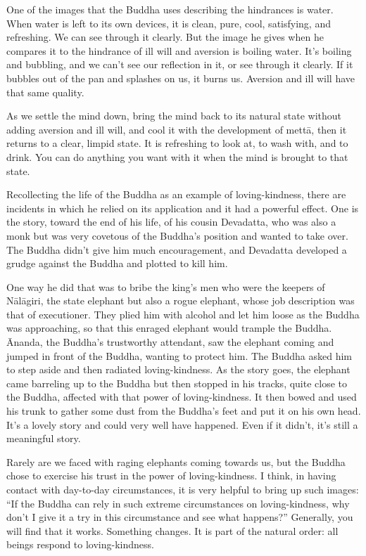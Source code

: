 One of the images that the Buddha uses describing the hindrances is
water. When water is left to its own devices, it is clean, pure, cool,
satisfying, and refreshing. We can see through it clearly. But the image
he gives when he compares it to the hindrance of ill will and aversion
is boiling water. It’s boiling and bubbling, and we can’t see our
reflection in it, or see through it clearly. If it bubbles out of the
pan and splashes on us, it burns us. Aversion and ill will have that
same quality.

As we settle the mind down, bring the mind back to its natural state
without adding aversion and ill will, and cool it with the development
of mettā, then it returns to a clear, limpid state. It is refreshing to
look at, to wash with, and to drink. You can do anything you want with
it when the mind is brought to that state.

Recollecting the life of the Buddha as an example of loving-kindness,
there are incidents in which he relied on its application and it had a
powerful effect. One is the story, toward the end of his life, of his
cousin Devadatta, who was also a monk but was very covetous of the
Buddha’s position and wanted to take over. The Buddha didn’t give him
much encouragement, and Devadatta developed a grudge against the Buddha
and plotted to kill him.

One way he did that was to bribe the king’s men who were the keepers of
Nālāgiri, the state elephant but also a rogue elephant, whose job
description was that of executioner. They plied him with alcohol and let
him loose as the Buddha was approaching, so that this enraged elephant
would trample the Buddha. Ānanda, the Buddha’s trustworthy attendant,
saw the elephant coming and jumped in front of the Buddha, wanting to
protect him. The Buddha asked him to step aside and then radiated
loving-kindness. As the story goes, the elephant came barreling up to
the Buddha but then stopped in his tracks, quite close to the Buddha,
affected with that power of loving-kindness. It then bowed and used his
trunk to gather some dust from the Buddha’s feet and put it on his own
head. It’s a lovely story and could very well have happened. Even if it
didn’t, it’s still a meaningful story.

Rarely are we faced with raging elephants coming towards us, but the
Buddha chose to exercise his trust in the power of loving-kindness. I
think, in having contact with day-to-day circumstances, it is very
helpful to bring up such images: “If the Buddha can rely in such extreme
circumstances on loving-kindness, why don’t I give it a try in this
circumstance and see what happens?” Generally, you will find that it
works. Something changes. It is part of the natural order: all beings
respond to loving-kindness.

